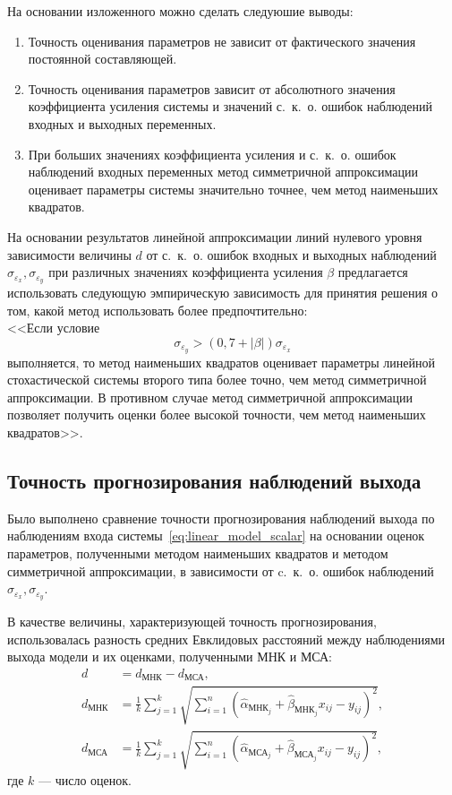 На основании изложенного можно сделать следуюшие выводы:
\begin{enumerate}
\item Точность оценивания параметров не зависит от фактического значения
  постоянной составляющей.
\item Точность оценивания параметров зависит от абсолютного значения
  коэффициента усиления системы и значений с.~к.~о. ошибок наблюдений
  входных и выходных переменных.
\item При больших значениях коэффициента усиления и с.~к.~о. ошибок наблюдений
  входных переменных метод симметричной аппроксимации оценивает
  параметры системы значительно точнее, чем метод наименьших квадратов.
\end{enumerate}

На основании результатов линейной аппроксимации линий нулевого уровня
зависимости величины \( d \) от с.~к.~о. ошибок входных и выходных наблюдений
\( \sigma_{\varepsilon_x}, \sigma_{\varepsilon_y} \)
при различных значениях коэффициента усиления \( \beta \) предлагается использовать
следующую эмпирическую зависимость для принятия решения о том, какой метод
использовать более предпочтительно: \\
<<Если условие
\begin{equation}
  \sigma_{\varepsilon_y} > (0{,}7 + |\beta|) \sigma_{\varepsilon_x}
  \label{eq:linear_rule_param}
\end{equation}
выполняется, то метод наименьших квадратов оценивает параметры линейной
стохастической системы второго типа более точно, чем метод симметричной аппроксимации.
В противном случае метод симметричной аппроксимации позволяет получить
оценки более высокой точности, чем метод наименьших квадратов>>.

\subsection{Точность прогнозирования наблюдений выхода}

Было выполнено сравнение точности прогнозирования наблюдений выхода по
наблюдениям входа системы~\eqref{eq:linear_model_scalar} на основании оценок параметров,
полученными методом наименьших квадратов и методом симметричной аппроксимации,
в зависимости от c.~к.~о. ошибок наблюдений \( \sigma_{\varepsilon_x}, \sigma_{\varepsilon_y} \).

В качестве величины, характеризующей точность прогнозирования,
использовалась разность средних Евклидовых расстояний между наблюдениями выхода модели и
их оценками, полученными МНК и МСА:
\begin{equation*}
  \begin{aligned}
    d &= d_{\text{МНК}} - d_{\text{МСА}}, \\
    d_{\text{МНК}} &= \frac{1}{k} \sum_{j=1}^k \sqrt{ \sum_{i=1}^n (\hat{\alpha}_{\text{МНК}_j} + \hat{\beta}_{\text{МНК}_j} x_{ij} - y_{ij})^2}, \\
    d_{\text{МСА}} &= \frac{1}{k} \sum_{j=1}^k \sqrt{ \sum_{i=1}^n (\hat{\alpha}_{\text{МСА}_j} + \hat{\beta}_{\text{МСА}_j} x_{ij} - y_{ij})^2},
    \end{aligned}
  \end{equation*}
где \( k \) --- число оценок.

